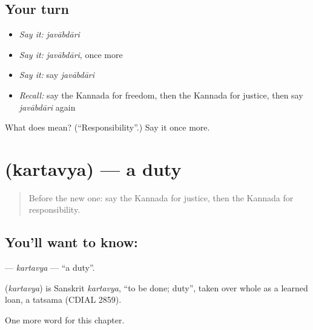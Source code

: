 \subsection*{Your turn}
\begin{itemize}
\raggedright
  \item \emph{Say it:} \emph{javābdāri}
  \item \emph{Say it:} \emph{javābdāri}, once more
  \item \emph{Say it:} say \emph{javābdāri}
  \item \emph{Recall:} say the Kannada for freedom, then the Kannada for justice, then say \emph{javābdāri} again
\end{itemize}

\begin{tcolorbox}[breakable,colback=teal!4,colframe=teal!35!black,title={Before you move on}]
What does  mean? (\textquotedblleft{}Responsibility\textquotedblright{}.) Say it once more.
\end{tcolorbox}
\section[\texorpdfstring{\kn{ಕರ್ತವ್ಯ} (kartavya)}{ಕರ್ತವ್ಯ (kartavya)}]{ (kartavya) — a duty}

\label{lesson:KA-C216-kartavya}



\begin{quote}
Before the new one: say the Kannada for justice, then the Kannada for responsibility.
\end{quote}

\subsection*{You'll want to know: }
\textbf{} — \emph{kartavya} — \textquotedblleft{}a duty\textquotedblright{}.

\begin{cousinweb}
\textbf{} (\emph{kartavya}) is Sanskrit \emph{kartavya}, \textquotedblleft{}to be done; duty\textquotedblright{}, taken over whole as a learned loan, a tatsama (CDIAL 2859).
\end{cousinweb}

\begin{grammarlens}[title={What you've built}]
One more word for this chapter.
\end{grammarlens}

